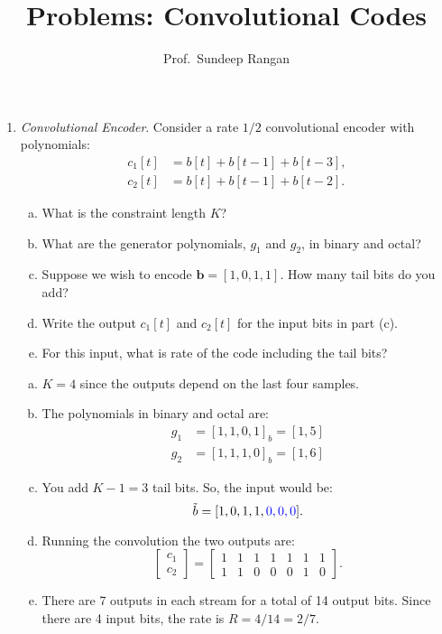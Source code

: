 \documentclass[11pt]{article}
\newcommand{\bs}[1]{{\boldsymbol{{#1}}}}
\begin{document}
\title{Problems:  Convolutional Codes}
\author{Prof.\ Sundeep Rangan}
\date{}

\maketitle

\begin{enumerate}

\item \emph{Convolutional Encoder}.  Consider a rate $1/2$ convolutional
encoder with polynomials:
\begin{align*}
    c_1[t] &= b[t]+b[t-1]+b[t-3], \\
    c_2[t] &= b[t]+b[t-1]+b[t-2].
\end{align*}
\begin{enumerate}[(a)]
\item What is the constraint length $K$?
\item What are the generator polynomials, $g_1$ and $g_2$,
in binary and octal?
\item Suppose we wish to encode $\bs{b}=[1,0,1,1]$.  
How many tail bits do you add?
\item Write the output $c_1[t]$ and $c_2[t]$ for the input bits in
part (c).
\item For this input, what is rate of the code including the tail bits?


\end{enumerate}

\begin{solution}
\begin{enumerate}[(a)]
\item $K=4$ since the outputs depend on the last four samples.
\item The polynomials in binary and octal are:
\begin{align*}
    g_1 &= [1,1,0,1]_b = [1,5] \\
    g_2 &= [1,1,1,0]_b = [1,6]
\end{align*}
\item You add $K-1=3$ tail bits.  So, the input would be:
\[
    \tilde{b} = [1,0,1,1,\textcolor{blue}{0,0,0}].
\]
\item Running the convolution the two outputs are:
\[
    \begin{bmatrix}
    c_1 \\
    c_2
    \end{bmatrix}
    =
    \begin{bmatrix}
    1 & 1 & 1 & 1 & 1 & 1 & 1 \\
    1 & 1 & 0 & 0 & 0 & 1 & 0
    \end{bmatrix}.
\]
\item \label{prob:fsm}
There are 7 outputs in each stream for a total of 14 output bits.  Since there are 4 input bits, the rate is $R=4/14=2/7$.
\end{enumerate}
\end{solution}


\end{enumerate}
\end{document}

